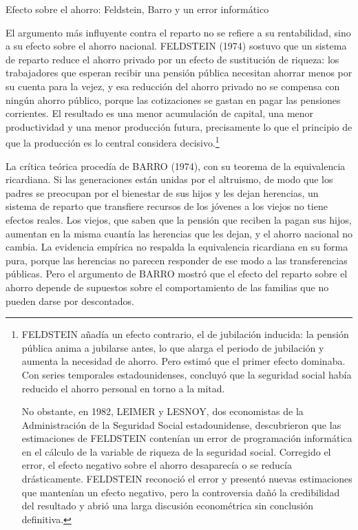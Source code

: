 \documentclass[10pt,a4paper]{article}
\begin{document}
Efecto sobre el ahorro: Feldstein, Barro y un error informático

El argumento más influyente contra el reparto no se refiere a su rentabilidad, sino a su efecto sobre el ahorro nacional. FELDSTEIN (1974) sostuvo que un sistema de reparto reduce el ahorro privado por un efecto de sustitución de riqueza: los trabajadores que esperan recibir una pensión pública necesitan ahorrar menos por su cuenta para la vejez, y esa reducción del ahorro privado no se compensa con ningún ahorro público, porque las cotizaciones se gastan en pagar las pensiones corrientes. El resultado es una menor acumulación de capital, una menor productividad y una menor producción futura, precisamente lo que el principio de que la producción es lo central considera decisivo.\footnote{FELDSTEIN añadía un efecto contrario, el de jubilación inducida: la pensión pública anima a jubilarse antes, lo que alarga el periodo de jubilación y aumenta la necesidad de ahorro. Pero estimó que el primer efecto dominaba. Con series temporales estadounidenses, concluyó que la seguridad social había reducido el ahorro personal en torno a la mitad.

No obstante, en 1982, LEIMER y LESNOY, dos economistas de la Administración de la Seguridad Social estadounidense, descubrieron que las estimaciones de FELDSTEIN contenían un error de programación informática en el cálculo de la variable de riqueza de la seguridad social. Corregido el error, el efecto negativo sobre el ahorro desaparecía o se reducía drásticamente. FELDSTEIN reconoció el error y presentó nuevas estimaciones que mantenían un efecto negativo, pero la controversia dañó la credibilidad del resultado y abrió una larga discusión econométrica sin conclusión definitiva.
}

La crítica teórica procedía de BARRO (1974), con su teorema de la equivalencia ricardiana. Si las generaciones están unidas por el altruismo, de modo que los padres se preocupan por el bienestar de sus hijos y les dejan herencias, un sistema de reparto que transfiere recursos de los jóvenes a los viejos no tiene efectos reales. Los viejos, que saben que la pensión que reciben la pagan sus hijos, aumentan en la misma cuantía las herencias que les dejan, y el ahorro nacional no cambia. La evidencia empírica no respalda la equivalencia ricardiana en su forma pura, porque las herencias no parecen responder de ese modo a las transferencias públicas. Pero el argumento de BARRO mostró que el efecto del reparto sobre el ahorro depende de supuestos sobre el comportamiento de las familias que no pueden darse por descontados.
\end{document}
